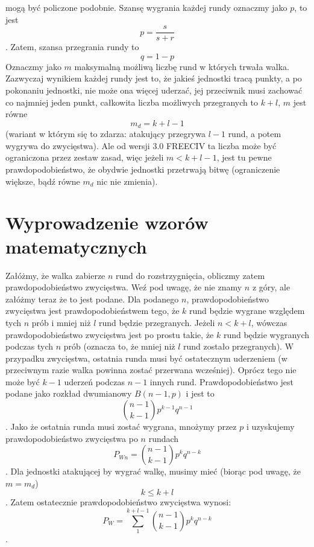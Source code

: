 \documentclass{article}
\begin{document}
mogą być policzone podobnie. Szansę wygrania każdej rundy oznaczmy jako $p$, to jest
\begin{equation*} 
    p =  \frac{s}{s+r}
\end{equation*}.
Zatem, szansa przegrania rundy to
\begin{equation*}
    q = 1-p
\end{equation*}
Oznaczmy jako $m$ maksymalną możliwą liczbę rund w których trwała walka. Zazwyczaj wynikiem każdej rundy jest to, że jakieś jednostki tracą punkty, a po pokonaniu jednostki, nie może ona więcej uderzać, jej przeciwnik musi zachować co najmniej jeden punkt, całkowita liczba możliwych przegranych to $k+l$, $m$ jest równe
\begin{equation*}
    m_d = k + l - 1
\end{equation*}
(wariant w którym się to zdarza: atakujący przegrywa $l-1$ rund, a potem wygrywa do zwycięstwa). Ale od wersji 3.0 FREECIV ta liczba może być ograniczona przez zestaw zasad, więc jeżeli $m<k+l-1$, jest tu pewne prawdopodobieństwo, że obydwie jednostki przetrwają bitwę (ograniczenie większe, bądź równe $m_d$ nic nie zmienia).

\section{Wyprowadzenie wzorów matematycznych}
Załóżmy, że walka zabierze $n$ rund do rozstrzygnięcia, obliczmy zatem prawdopodobieństwo zwycięstwa. Weź pod uwagę, że nie znamy $n$ z góry, ale załóżmy teraz że to jest podane. Dla podanego $n$, prawdopodobieństwo zwycięstwa jest prawdopodobieństwem tego, że $k$ rund będzie wygrane względem tych $n$ prób i mniej niż $l$ rund będzie przegranych. Jeżeli $n<k+l$, wówczas prawdopodobieństwo zwycięstwa jest po prostu takie, że $k$ rund będzie wygranych podczas tych $n$ prób (oznacza to, że mniej niż $l$ rund zostało przegranych). W przypadku zwycięstwa, ostatnia runda musi być ostatecznym uderzeniem (w przeciwnym razie walka powinna zostać przerwana wcześniej). Oprócz tego nie może być $k-1$ uderzeń podczas $n-1$ innych rund. Prawdopodobieństwo jest podane jako rozkład dwumianowy $B(n-1,p)$ i jest to
\begin{equation*}
\binom{n - 1}{k - 1}p^{k-1}q^{n-1}
\end{equation*}.
Jako że ostatnia runda musi zostać wygrana, mnożymy przez $p$ i uzyskujemy prawdopodobieństwo zwycięstwa po $n$ rundach
\begin{equation*}
    P_{Wn} = \binom{n-1}{k-1}p^{k}q^{n-k}
\end{equation*}.
Dla jednostki atakującej by wygrać walkę, musimy mieć (biorąc pod uwagę, że $m = m_d$)
\begin{equation}
    k \leq k + l
    \label{eq:1}
\end{equation}.
\newline
Zatem ostatecznie prawdopodobieństwo zwycięstwa wynosi:\newline
\begin{equation*}
    P_W =  \sum^{k+l-1}_1 \binom{n-1}{k-1}p^{k}q^{n-k} 
\end{equation*}.
\end{document}
